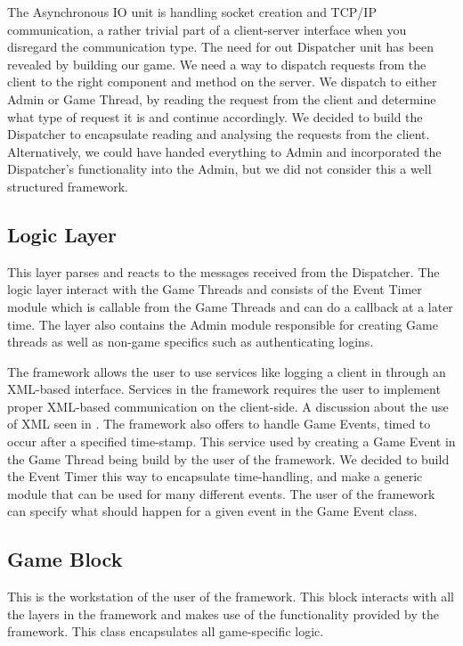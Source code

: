 The Asynchronous IO unit is handling socket creation and TCP/IP communication, a rather trivial part of a client-server interface when you disregard the communication type. The need for out Dispatcher unit has been revealed by building our game. We need a way to dispatch requests from the client to the right component and method on the server. We dispatch to either Admin or Game Thread, by reading the request from the client and determine what type of request it is and continue accordingly. We decided to build the Dispatcher to encapsulate reading and analysing the requests from the client. Alternatively, we could have handed everything to Admin and incorporated the Dispatcher's functionality into the Admin, but we did not consider this a well structured framework.




\subsection{Logic Layer}
This layer parses and reacts to the messages received from the Dispatcher. The logic layer interact with the Game Threads and consists of the Event Timer module which is callable from the Game Threads and can do a callback at a later time. The layer also contains the Admin module responsible for creating Game threads as well as non-game specifics such as authenticating logins.

The framework allows the user to use services like logging a client in through an XML-based interface. Services in the framework requires the user to implement proper XML-based communication on the client-side. A discussion about the use of XML seen in . The framework also offers to handle Game Events, timed to occur after a specified time-stamp. This service used by creating a Game Event in the Game Thread being build by the user of the framework. We decided to build the Event Timer this way to encapsulate time-handling, and make a generic module that can be used for many different events. The user of the framework can specify what should happen for a given event in the Game Event class.




\subsection{Game Block}
This is the workstation of the user of the framework. This block interacts with all the layers in the framework and makes use of the functionality provided by the framework. This class encapsulates all game-specific logic.

